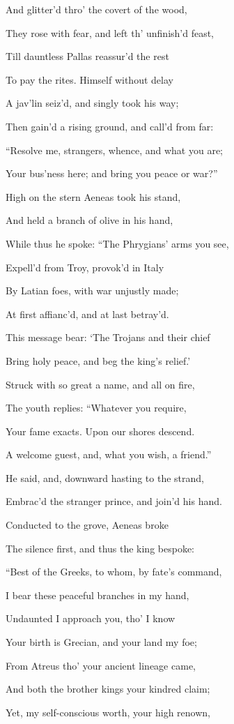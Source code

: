 And glitter’d thro’ the covert of the wood,

They rose with fear, and left th’ unfinish’d feast,

Till dauntless Pallas reassur’d the rest

To pay the rites. Himself without delay

A jav’lin seiz’d, and singly took his way;

Then gain’d a rising ground, and call’d from far:

“Resolve me, strangers, whence, and what you are;

Your bus’ness here; and bring you peace or war?”

High on the stern Aeneas took his stand,

And held a branch of olive in his hand,

While thus he spoke: “The Phrygians’ arms you see,

Expell’d from Troy, provok’d in Italy

By Latian foes, with war unjustly made;

At first affianc’d, and at last betray’d.

This message bear: ‘The Trojans and their chief

Bring holy peace, and beg the king’s relief.’

Struck with so great a name, and all on fire,

The youth replies: “Whatever you require,

Your fame exacts. Upon our shores descend.

A welcome guest, and, what you wish, a friend.”

He said, and, downward hasting to the strand,

Embrac’d the stranger prince, and join’d his hand.

Conducted to the grove, Aeneas broke

The silence first, and thus the king bespoke:

“Best of the Greeks, to whom, by fate’s command,

I bear these peaceful branches in my hand,

Undaunted I approach you, tho’ I know

Your birth is Grecian, and your land my foe;

From Atreus tho’ your ancient lineage came,

And both the brother kings your kindred claim;

Yet, my self-conscious worth, your high renown,

